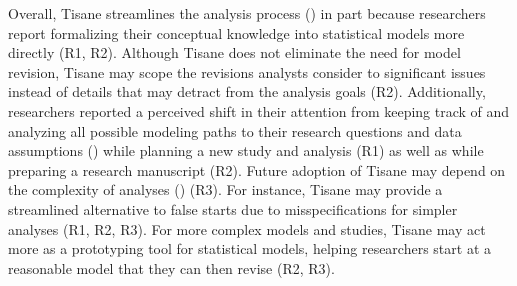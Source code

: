 Overall, Tisane streamlines the analysis process (\rqWorkflow) in part because
researchers report formalizing their conceptual knowledge into statistical
models more directly (R1, R2). Although Tisane does not eliminate the need for
model revision, Tisane may scope the revisions analysts consider to significant
issues instead of details that may detract from the analysis goals (R2).
Additionally, researchers reported a perceived shift in their attention from
keeping track of and analyzing all possible modeling paths to their research
questions and data assumptions (\rqCognitive) while planning a new study and
analysis (R1) as well as while preparing a research manuscript (R2). Future adoption of
Tisane may depend on the complexity of analyses (\rqFuture) (R3). For instance, Tisane may provide a
streamlined alternative to false starts due to misspecifications for simpler
analyses (R1, R2, R3). For more complex models and studies, Tisane may act more as a
prototyping tool for statistical models, helping researchers start at a
reasonable model that they can then revise (R2, R3).
